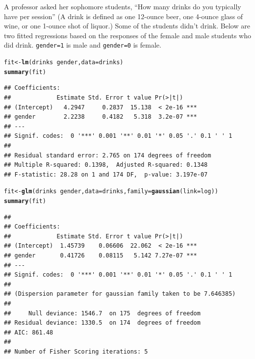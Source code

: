 \documentclass[landscape,twocolumn,letterpaper,9pt,reqno]{article}\usepackage[]{graphicx}\usepackage[]{color}
\newcommand{\hlopt}[1]{\textcolor[rgb]{0,0,0}{#1}}%
\newcommand{\hlstd}[1]{\textcolor[rgb]{0.345,0.345,0.345}{#1}}%
\newcommand{\hlkwb}[1]{\textcolor[rgb]{0.69,0.353,0.396}{#1}}%
\newcommand{\hlkwc}[1]{\textcolor[rgb]{0.333,0.667,0.333}{#1}}%
\newcommand{\hlkwd}[1]{\textcolor[rgb]{0.737,0.353,0.396}{\textbf{#1}}}%
\newenvironment{knitrout}{}{} %
\begin{document}
A professor asked her sophomore students, “How many drinks do you typically have per session” (A drink is defined as one 12-ounce
beer, one 4-ounce glass of wine, or one 1-ounce shot of liquor.) Some of the students didn’t drink. Below are two fitted regressions based on the responses of the female and male students who did drink. \texttt{gender=1} is male and \texttt{gender=0} is female. 



\begin{knitrout}\footnotesize
{}\color{fgcolor}
\begin{alltt}
\hlstd{fit} \hlkwb{<-} \hlkwd{lm}\hlstd{(drinks} \hlopt{~} \hlstd{gender,} \hlkwc{data} \hlstd{= drinks)}
\hlkwd{summary}\hlstd{(fit)}
\end{alltt}
\begin{verbatim}
## Coefficients:
##             Estimate Std. Error t value Pr(>|t|)    
## (Intercept)   4.2947     0.2837  15.138  < 2e-16 ***
## gender        2.2238     0.4182   5.318  3.2e-07 ***
## ---
## Signif. codes:  0 '***' 0.001 '**' 0.01 '*' 0.05 '.' 0.1 ' ' 1
## 
## Residual standard error: 2.765 on 174 degrees of freedom
## Multiple R-squared: 0.1398,	Adjusted R-squared: 0.1348 
## F-statistic: 28.28 on 1 and 174 DF,  p-value: 3.197e-07
\end{verbatim}
\begin{alltt}
\hlstd{fit} \hlkwb{<-} \hlkwd{glm}\hlstd{(drinks} \hlopt{~} \hlstd{gender,} \hlkwc{data} \hlstd{= drinks,} \hlkwc{family} \hlstd{=} \hlkwd{gaussian}\hlstd{(}\hlkwc{link}\hlstd{=log))}
\hlkwd{summary}\hlstd{(fit)}
\end{alltt}
\begin{verbatim}
## 
## Coefficients:
##             Estimate Std. Error t value Pr(>|t|)    
## (Intercept)  1.45739    0.06606  22.062  < 2e-16 ***
## gender       0.41726    0.08115   5.142 7.27e-07 ***
## ---
## Signif. codes:  0 '***' 0.001 '**' 0.01 '*' 0.05 '.' 0.1 ' ' 1
## 
## (Dispersion parameter for gaussian family taken to be 7.646385)
## 
##     Null deviance: 1546.7  on 175  degrees of freedom
## Residual deviance: 1330.5  on 174  degrees of freedom
## AIC: 861.48
## 
## Number of Fisher Scoring iterations: 5
\end{verbatim}

\end{knitrout}
\end{document}
